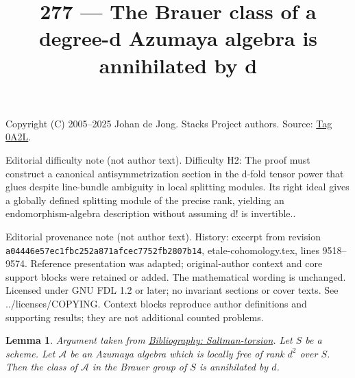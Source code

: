 \documentclass{amsart}
\newenvironment{reference}{\comment}{\endcomment}
\theoremstyle{plain}
\newtheorem{lemma}[subsection]{Lemma}
\theoremstyle{definition}
\theoremstyle{remark}
\numberwithin{equation}{subsection}
\begin{document}
\title[Stacks Project, Tag 0A2L]{277 --- The Brauer class of a degree-d Azumaya algebra is annihilated by d}
\maketitle
\noindent Copyright (C) 2005--2025 Johan de Jong. Stacks Project authors. Source: \href{https://stacks.math.columbia.edu/tag/0A2L}{Tag 0A2L}.

\noindent Editorial difficulty note (not author text). Difficulty H2: The proof must construct a canonical antisymmetrization section in the d-fold tensor power that glues despite line-bundle ambiguity in local splitting modules. Its right ideal gives a globally defined splitting module of the precise rank, yielding an endomorphism-algebra description without assuming d! is invertible..

\noindent Editorial provenance note (not author text). History: excerpt from revision \texttt{a0444\allowbreak 6e57e\allowbreak c1fbc\allowbreak 252a8\allowbreak 71afc\allowbreak ec775\allowbreak 2fb28\allowbreak 07b14}, etale-cohomology.tex, lines 9518--9574. Reference presentation was adapted; original-author context and core support blocks were retained or added. The mathematical wording is unchanged. Licensed under GNU FDL 1.2 or later; no invariant sections or cover texts. See ../licenses/COPYING. Context blocks reproduce author definitions and supporting results; they are not additional counted problems.

\begin{lemma}
\label{lemma-annihilated-by-degree}
\begin{reference}
Argument taken from \href{https://stacks.math.columbia.edu/bibliography}{Bibliography: Saltman-torsion}.
\end{reference}
Let $S$ be a scheme. Let $\mathcal{A}$ be an Azumaya algebra which is
locally free of rank $d^2$ over $S$. Then the class
of $\mathcal{A}$ in the Brauer group of $S$ is annihilated by $d$.
\end{lemma}
\end{document}
